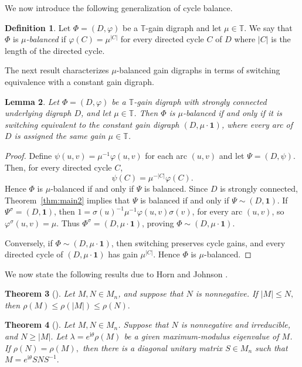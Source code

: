 \documentclass[12pt]{article}
\newtheorem{theorem}{Theorem}[section]
\newtheorem{lemma}[theorem]{Lemma}
\theoremstyle{definition}
\newtheorem{definition}[theorem]{Definition}
\newcommand{\TT}{\mathbb{T}}
\begin{document}
We now introduce the following generalization of cycle balance.

\begin{definition}
Let $\Phi=(D,\varphi)$ be a $\TT$-gain digraph and let $\mu\in\TT$. We say that $\Phi$ is \emph{$\mu$-balanced} if $\varphi(C)=\mu^{|C|}$ for every directed cycle $C$ of $D$ where $|C|$ is the length of the directed cycle.
\end{definition}

The next result characterizes $\mu$-balanced gain digraphs in terms of switching equivalence with a constant gain digraph.

\begin{lemma}\label{lem:mubalance}
Let $\Phi=(D,\varphi)$ be a $\TT$-gain digraph with strongly connected underlying digraph $D$, and let $\mu\in\TT$. Then $\Phi$ is
$\mu$-balanced if and only if it is switching equivalent to the
constant gain digraph $(D,\mu\cdot\mathbf{1})$, where every arc of $D$ is assigned the same gain $\mu\in\TT$.
\end{lemma}
\begin{proof}
Define $\psi(u,v)=\mu^{-1}\varphi(u,v)$ for each arc $(u,v)$ and let
$\Psi=(D,\psi)$. Then, for every directed cycle $C$,
\[
\psi(C)=\mu^{-|C|}\varphi(C).
\]
Hence $\Phi$ is $\mu$-balanced if and only if $\Psi$ is balanced. Since
$D$ is strongly connected, Theorem~\ref{thm:main2} implies that
$\Psi$ is balanced if and only if $\Psi\sim(D,\mathbf1)$. If $\Psi^\sigma=(D,\mathbf1)$, then $1=\sigma(u)^{-1}\mu^{-1}\varphi(u,v)\sigma(v)$, for every arc $(u,v)$, so $\varphi^\sigma(u,v)=\mu$. Thus $\Phi^\sigma=(D,\mu\cdot\mathbf1)$, proving $\Phi\sim(D,\mu\cdot\mathbf1)$.

Conversely, if $\Phi\sim(D,\mu\cdot\mathbf1)$, then switching preserves cycle gains, and every directed cycle of $(D,\mu\cdot\mathbf1)$ has gain $\mu^{|C|}$. Hence $\Phi$ is $\mu$-balanced.
\end{proof}

We now state the following results due to Horn and Johnson \cite{HornJohnson}.

\begin{theorem}[{\cite[P.~520]{HornJohnson}}]
\label{thm:horn}
Let $M,N\in M_n$, and suppose that $N$ is nonnegative. If
\(
|M|\le N,
\)
then
\(
\rho(M)\le \rho(|M|)\le \rho(N).
\)
\end{theorem}

\begin{theorem}[{\cite[p.~533]{HornJohnson}}]\label{thm:wielandt}
Let $M, N \in M_n$. Suppose that $N$ is nonnegative and irreducible, and
\(
N \ge |M|.
\)
Let $\lambda=e^{\mathrm{i}\theta}\rho(M)$ be a given maximum-modulus eigenvalue of $M$. If
\(
\rho(N)=\rho(M),
\)
then there is a diagonal unitary matrix $S\in M_n$ such that
\(
M=e^{\mathrm{i}\theta}SNS^{-1}.
\)
\end{theorem}
\end{document}
